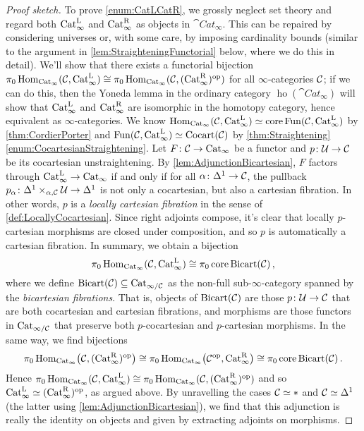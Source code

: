 \begin{proof}[Proof sketch]
	To prove \cref{enum:CatLCatR}, we grossly neglect set theory and regard both $\mathrm{Cat}_\infty^{\mathrm{L}}$ and $\mathrm{Cat}_\infty^{\mathrm{R}}$ as objects in $\cat{Cat}_\infty$. This can be repaired by considering universes or, with some care, by imposing cardinality bounds (similar to the argument in \cref{lem:StraighteningFunctorial} below, where we do this in detail). We'll show that there exists a functorial bijection $\pi_0\operatorname{Hom}_{\mathrm{Cat}_\infty}(\mathcal{C},\mathrm{Cat}_\infty^{\mathrm{L}})\cong \pi_0\operatorname{Hom}_{\mathrm{Cat}_\infty}(\mathcal{C},(\mathrm{Cat}_\infty^{\mathrm{R}})^{\mathrm{op}})$ for all $\infty$-categories $\mathcal{C}$; if we can do this, then the Yoneda lemma in the ordinary category $\operatorname{ho}(\cat{Cat}_\infty)$ will show that $\mathrm{Cat}_\infty^{\mathrm{L}}$ and $\mathrm{Cat}_\infty^{\mathrm{R}}$ are isomorphic in the homotopy category, hence equivalent as $\infty$-categories. We know $\operatorname{Hom}_{\mathrm{Cat}_\infty}(\mathcal{C},\mathrm{Cat}_\infty^{\mathrm{L}})\simeq \operatorname{core}\operatorname{Fun}(\mathcal{C},\mathrm{Cat}_\infty^{\mathrm{L}})$ by \cref{thm:CordierPorter} and $\operatorname{Fun}(\mathcal{C},\mathrm{Cat}_\infty^{\mathrm{L}})\simeq \mathrm{Cocart}(\mathcal{C})$ by \cref{thm:Straightening}\cref{enum:CocartesianStraightening}. Let $F\colon \mathcal{C}\rightarrow \mathrm{Cat}_\infty$ be a functor and $p\colon \mathcal{U}\rightarrow \mathcal{C}$ be its cocartesian unstraightening. By \cref{lem:AdjunctionBicartesian}, $F$ factors through $\mathrm{Cat}_\infty^{\mathrm{L}}\rightarrow \mathrm{Cat}_\infty$ if and only if for all $\alpha\colon\Delta^1\rightarrow \mathcal{C}$, the pullback $p_{\alpha}\colon \Delta^1\times_{\alpha,\mathcal{C}}\mathcal{U}\rightarrow \Delta^1$ is not only a cocartesian, but also a cartesian fibration. In other words, $p$ is a \emph{locally cartesian fibration} in the sense of \cref{def:LocallyCocartesian}. Since right adjoints compose, it's clear that locally $p$-cartesian morphisms are closed under composition, and so $p$ is automatically a cartesian fibration. In summary, we obtain a bijection 
	\begin{equation*}
		\pi_0\operatorname{Hom}_{\mathrm{Cat}_\infty}(\mathcal{C},\mathrm{Cat}_\infty^{\mathrm{L}})\cong \pi_0\operatorname{core}\mathrm{Bicart}(\mathcal{C})\,,
	\end{equation*}
	where we define $\mathrm{Bicart}(\mathcal{C})\subseteq \mathrm{Cat}_{\infty/\mathcal{C}}$ as the non-full sub-$\infty$-category spanned by the \emph{bicartesian fibrations}. That is, objects of $\mathrm{Bicart}(\mathcal{C})$ are those $p\colon \mathcal{U}\rightarrow \mathcal{C}$ that are both cocartesian and cartesian fibrations, and morphisms are those functors in $\mathrm{Cat}_{\infty/\mathcal{C}}$ that preserve both $p$-cocartesian and $p$-cartesian morphisms. In the same way, we find bijections 
	\begin{equation*}
		\pi_0\operatorname{Hom}_{\mathrm{Cat}_\infty}\bigl(\mathcal{C},(\mathrm{Cat}_\infty^{\mathrm{R}})^{\mathrm{op}}\bigr)\cong \pi_0\operatorname{Hom}_{\mathrm{Cat}_\infty}\bigl(\mathcal{C}^{\mathrm{op}},\mathrm{Cat}_\infty^{\mathrm{R}}\bigr)\cong \pi_0\operatorname{core}\mathrm{Bicart}(\mathcal{C})\,.
	\end{equation*}
	Hence $\pi_0\operatorname{Hom}_{\mathrm{Cat}_\infty}(\mathcal{C},\mathrm{Cat}_\infty^{\mathrm{L}})\cong \pi_0\operatorname{Hom}_{\mathrm{Cat}_\infty}(\mathcal{C},(\mathrm{Cat}_\infty^{\mathrm{R}})^{\mathrm{op}})$ and so $\mathrm{Cat}_\infty^{\mathrm{L}}\simeq (\mathrm{Cat}_\infty^{\mathrm{R}})^{\mathrm{op}}$, as argued above. By unravelling the cases $\mathcal{C}\simeq *$ and $\mathcal{C}\simeq \Delta^1$ (the latter using \cref{lem:AdjunctionBicartesian}), we find that this adjunction is really the identity on objects and given by extracting adjoints on morphisms.
\end{proof}

